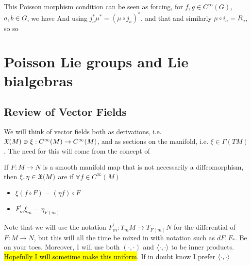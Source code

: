 \documentclass{article}
\begin{document}
This Poisson morphism condition can be seen as forcing, for $f,g \in C^\infty(G)$, $a,b \in G$, we have 
And using $j_a^\ast \mu^\ast = (\mu \circ j_a)^\ast$, and that 
and similarly $\mu \circ i_a = R_a$, so 
so 

\section{Poisson Lie groups and Lie bialgebras}

\subsection{Review of Vector Fields}
We will think of vector fields both as derivations, i.e. $\mathfrak{X}(M) \ni \xi : C^\infty(M) \to C^\infty(M)$, and as sections on the manifold, i.e. $\xi \in \Gamma(TM)$. The need for this will come from the concept of 

\begin{definition}
If $F:M \to N$ is a smooth manifold map that is not necessarily a diffeomorphism, then $\xi,\eta \in \mathfrak{X}(M)$ are  if $\forall f \in C^\infty(M)$
\begin{itemize}
    \item $\xi(f \circ F) = (\eta f) \circ F$
    \item $F^\prime_m \xi_m = \eta_{F(m)}$
\end{itemize}
\end{definition}

\begin{notation}
Note that we will use the notation $F^\prime_m:T_mM \to T_{F(m)}N$ for the differential of $F:M \to N$, but this will all the time be mixed in with notation such as $dF, F_\ast$. Be on your toes. Moreover, I will use both $(\cdot, \cdot)$ and $\left\langle \cdot, \cdot \right\rangle$ to be inner products. \hl{Hopefully I will sometime make this uniform}. If in doubt know I prefer $\left\langle \cdot, \cdot \right\rangle$
\end{notation}
\end{document}
